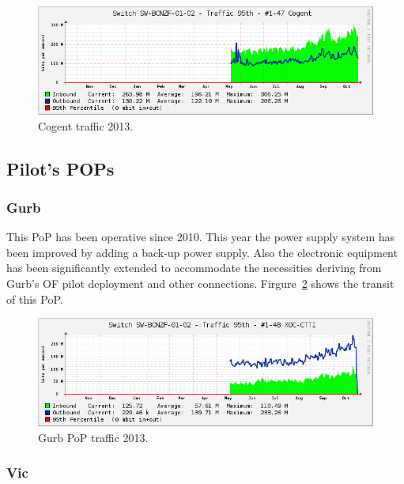 \begin{figure}[H]
  \centering
  \includegraphics[width=0.95\linewidth]{sect3/figures/cogent.png} 
  \caption[Cogent traffic 2013]{Cogent traffic 2013.}
  \label{fig:cogent_transit}
\end{figure}

\FloatBarrier
\subsection{Pilot's POPs}
\label{pop_pilots}


\FloatBarrier
\subsubsection{Gurb}
\label{pop_gurb}

This PoP has been operative since 2010. This year the power supply system has been improved by adding a back-up power supply. Also the electronic equipment has been significantly extended to accommodate the necessities deriving from Gurb's OF pilot deployment and other connections. Firgure~\ref{fig:gurb_transit} shows the transit of this PoP.

\begin{figure}[H]
  \centering
  \includegraphics[width=0.95\linewidth]{sect3/figures/gurb.png} 
  \caption[Gurb PoP traffic 2013]{Gurb PoP traffic 2013.}
  \label{fig:gurb_transit}
\end{figure}


\FloatBarrier
\subsubsection{Vic}
\label{pop_vic}

